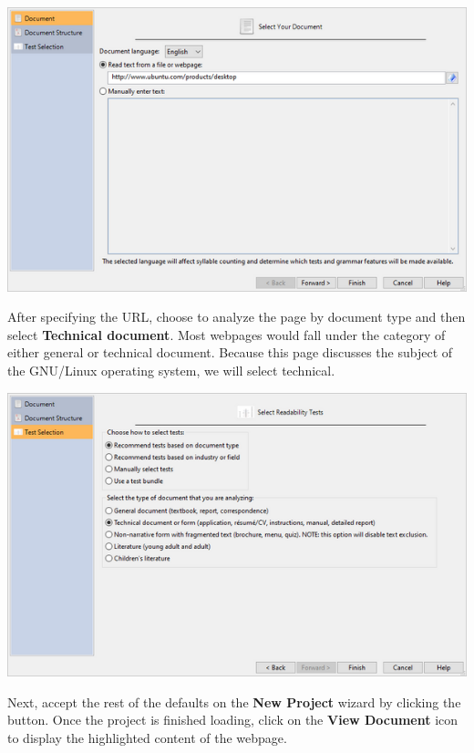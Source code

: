 \documentclass[
]{book}
\theoremstyle{definition}
\theoremstyle{definition}
\theoremstyle{definition}
\theoremstyle{definition}
\theoremstyle{remark}
\begin{document}
\includegraphics{Images/webpath.png}

After specifying the URL, choose to analyze the page by document type and then select \textbf{Technical document}. Most webpages would fall under the category of either general or technical document. Because this page discusses the subject of the GNU/Linux operating system, we will select technical.

\includegraphics{Images/wizarddoctypetechselected.png}

Next, accept the rest of the defaults on the \textbf{New Project} wizard by clicking the  button. Once the project is finished loading, click on the \textbf{View Document} icon to display the highlighted content of the webpage.
\end{document}
